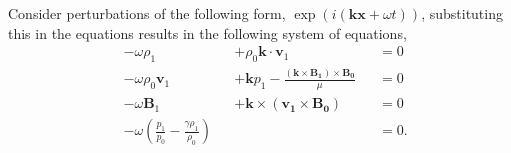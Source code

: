 \documentclass[a4paper]{article}
\numberwithin{figure}{section}
\numberwithin{equation}{section}
\begin{document}
\medskip

Consider perturbations of the following form, $\exp(i(\mathbf{kx} + \omega t))$, substituting this in the equations results in the following system of equations,
\begin{subequations}\label{eq:MHD_wave}	
\begin{alignat}{3}
    &-\omega\rho_1 &&+  \rho_0 \mathbf{k}\cdot\mathbf v_1 &&= 0 \label{eq:MHD_linear_wave_mass}\\
    &-\omega\rho_0\mathbf v_1 &&+  \mathbf{k} p_1 - \frac{(\mathbf{k} \times \mathbf{B_1}) \times \mathbf{B_0}}{\mu} &&= 0 \label{eq:MHD_linear_wave_moment}\\
    &-\omega\mathbf B_1&&+ \mathbf{k} \times (\mathbf{v_1} \times \mathbf{B_0}) &&= 0 \label{eq:MHD_linear_wave_charge}\\
    &-\omega\left(\frac{p_1}{p_0} - \frac{\gamma\rho_1}{\rho_0}\right) && &&= 0  \label{eq:MHD_linear_wave_enery}.
\end{alignat}
\end{subequations}
\end{document}
